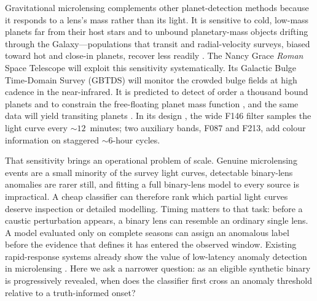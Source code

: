 \documentclass[twocolumn,linenumbers,floatfix,twocolappendix]{aastex701}
\newcommand{\Rom}{\textit{Roman}}
\begin{document}
Gravitational microlensing complements other planet-detection methods because it responds to a
lens's mass rather than its light. It is sensitive to cold, low-mass planets far from their host
stars and to unbound planetary-mass objects drifting through the Galaxy---populations that transit
and radial-velocity surveys, biased toward hot and close-in planets, recover less readily
\citep{Mao1991,GouldLoeb1992,Suzuki2016}. The Nancy Grace \Rom{} Space Telescope will exploit
this sensitivity systematically. Its Galactic Bulge Time-Domain Survey (GBTDS) will monitor the
crowded bulge fields at high cadence in the near-infrared. It is predicted to detect of order a
thousand bound planets and to constrain the free-floating planet mass function
\citep{Spergel2015,Penny2019,Johnson2020,Sumi2023,Gaudi2012}, and the same data will yield
transiting planets \citep{Wilson2023}. In its design
\citep{ROTAC2025,STScI2025GBTDS}, the wide F146 filter samples the light curve every
$\sim12$~minutes; two auxiliary bands, F087 and F213, add colour information on staggered
$\sim$6-hour cycles.

That sensitivity brings an operational problem of scale. Genuine microlensing events are a small
minority of the survey light curves, detectable binary-lens anomalies are rarer still, and fitting
a full binary-lens model to every source is impractical. A cheap classifier can therefore rank
which partial light curves deserve inspection or detailed modelling. Timing matters to that task:
before a caustic perturbation appears, a binary lens can resemble an ordinary single lens. A model
evaluated only on complete seasons can assign an anomalous label before the evidence that defines
it has entered the observed window. Existing rapid-response systems already show the value of
low-latency anomaly detection in microlensing \citep{Udalski2003,Dominik2007,Dominik2008,Tsapras2009}.
Here we ask a narrower question: as an eligible synthetic binary is progressively revealed, when
does the classifier first cross an anomaly threshold relative to a truth-informed onset?
\end{document}
